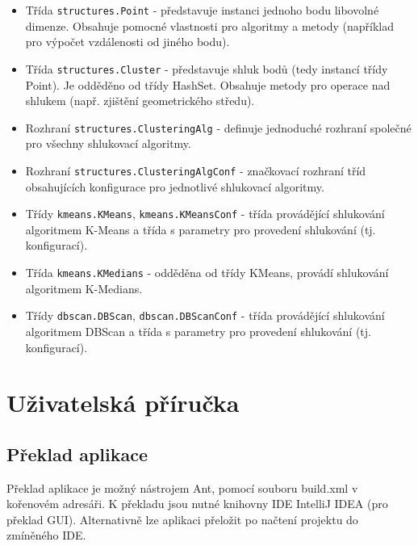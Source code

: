 \documentclass[pdftex,a4paper]{article}
\begin{document}
\medskip

\begin{itemize}
	\item Třída \texttt{structures.Point} - představuje instanci jednoho bodu libovolné dimenze. Obsahuje pomocné vlastnosti pro algoritmy a metody (například pro výpočet vzdálenosti od jiného bodu).
	
	\item Třída \texttt{structures.Cluster} - představuje shluk bodů (tedy instancí třídy Point). Je odděděno od třídy HashSet. Obsahuje metody pro operace nad shlukem (např. zjištění geometrického středu).
	
	\item Rozhraní \texttt{structures.ClusteringAlg} - definuje jednoduché rozhraní společné pro všechny shlukovací algoritmy.
	
	\item Rozhraní \texttt{structures.ClusteringAlgConf} - značkovací rozhraní tříd obsahujících konfigurace pro jednotlivé shlukovací algoritmy.
\end{itemize}

\medskip

\begin{itemize}
	\item Třídy \texttt{kmeans.KMeans}, \texttt{kmeans.KMeansConf} - třída provádějící shlukování algoritmem K-Means a třída s parametry pro provedení shlukování (tj. konfigurací).
	
	\item Třída \texttt{kmeans.KMedians} - odděděna od třídy KMeans, provádí shlukování algoritmem K-Medians.
	
	\item Třídy \texttt{dbscan.DBScan}, \texttt{dbscan.DBScanConf} - třída provádějící shlukování algoritmem DBScan a třída s parametry pro provedení shlukování (tj. konfigurací).
\end{itemize}




\section{Uživatelská příručka}

\subsection{Překlad aplikace}
Překlad aplikace je možný nástrojem Ant, pomocí souboru build.xml v kořenovém adresáři. K překladu jsou nutné knihovny IDE IntelliJ IDEA (pro překlad GUI). Alternativně lze aplikaci přeložit po načtení projektu do zmíněného IDE.
\end{document}
